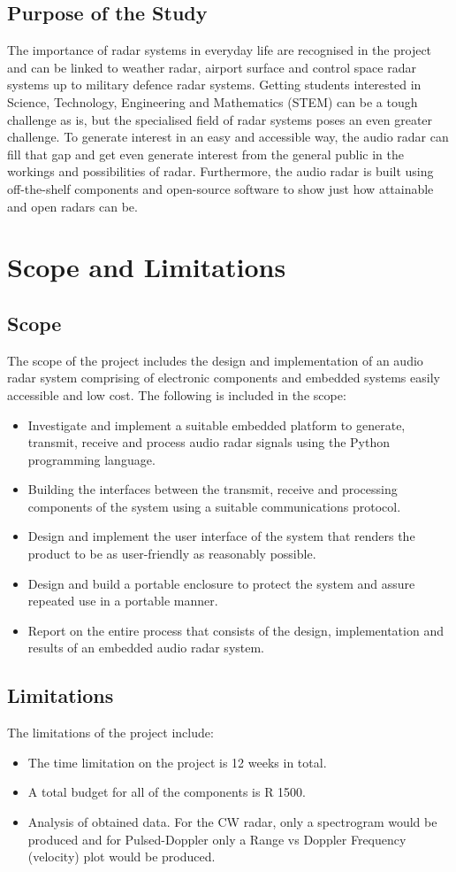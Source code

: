 \subsection{Purpose of the Study}
The importance of radar systems in everyday life are recognised in the project and can be linked to weather radar, airport surface and control space radar systems up to military defence radar systems. Getting students interested in Science, Technology, Engineering and Mathematics (STEM) can be a tough challenge as is, but the specialised field of radar systems poses an even greater challenge. To generate interest in an easy and accessible way, the audio radar can fill that gap and get even generate interest from the general public in the workings and possibilities of radar. Furthermore, the audio radar is built using off-the-shelf components and open-source software to show just how attainable and open radars can be.

\section{Scope and Limitations}
\subsection{Scope}
The scope of the project includes the design and implementation of an audio radar system comprising of electronic components and embedded systems easily accessible and low cost. The following is included in the scope:
\begin{itemize}
\item Investigate and implement a suitable embedded platform to generate, transmit, receive and process audio radar signals using the Python programming language.
\item Building the interfaces between the transmit, receive and processing components of the system using a suitable communications protocol.
\item Design and implement the user interface of the system that renders the product to be as user-friendly as reasonably possible.
\item Design and build a portable enclosure to protect the system and assure repeated use in a portable manner.
\item Report on the entire process that consists of the design, implementation and results of an embedded audio radar system.
\end{itemize}
\subsection{Limitations}
The limitations of the project include:
\begin{itemize}
\item The time limitation on the project is 12 weeks in total.
\item A total budget for all of the components is R 1500.
\item Analysis of obtained data. For the CW radar, only a spectrogram would be produced and for Pulsed-Doppler only a Range vs Doppler Frequency (velocity) plot would be produced.
\end{itemize}

